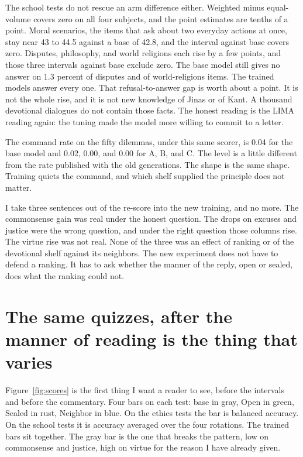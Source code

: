 \documentclass[11pt]{article}
\begin{document}
The school tests do not rescue an arm difference either. Weighted minus equal-volume covers zero on all four subjects, and the point estimates are tenths of a point. Moral scenarios, the items that ask about two everyday actions at once, stay near 43 to 44.5 against a base of 42.8, and the interval against base covers zero. Disputes, philosophy, and world religions each rise by a few points, and those three intervals against base exclude zero. The base model still gives no answer on 1.3 percent of disputes and of world-religions items. The trained models answer every one. That refusal-to-answer gap is worth about a point. It is not the whole rise, and it is not new knowledge of Jinas or of Kant. A thousand devotional dialogues do not contain those facts. The honest reading is the LIMA reading again: the tuning made the model more willing to commit to a letter.

The command rate on the fifty dilemmas, under this same scorer, is 0.04 for the base model and 0.02, 0.00, and 0.00 for A, B, and C. The level is a little different from the rate published with the old generations. The shape is the same shape. Training quiets the command, and which shelf supplied the principle does not matter.

I take three sentences out of the re-score into the new training, and no more. The commonsense gain was real under the honest question. The drops on excuses and justice were the wrong question, and under the right question those columns rise. The virtue rise was not real. None of the three was an effect of ranking or of the devotional shelf against its neighbors. The new experiment does not have to defend a ranking. It has to ask whether the manner of the reply, open or sealed, does what the ranking could not.

\section{The same quizzes, after the manner of reading is the thing that varies}
\label{sec:results}

Figure~\ref{fig:scores} is the first thing I want a reader to see, before the intervals and before the commentary. Four bars on each test: base in gray, Open in green, Sealed in rust, Neighbor in blue. On the ethics tests the bar is balanced accuracy. On the school tests it is accuracy averaged over the four rotations. The trained bars sit together. The gray bar is the one that breaks the pattern, low on commonsense and justice, high on virtue for the reason I have already given.
\end{document}
